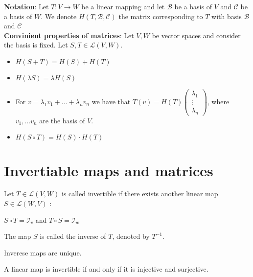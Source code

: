 \textbf{Notation}: Let $T : V \rightarrow W$ be a linear mapping and let $\mathcal{B}$ be a basis of $V$ and $\mathcal{C}$ be a basis of $W$. We denote $H(T, \mathcal{B}, \mathcal{C})$ the matrix corresponding to $T$ with basis $\mathcal{B}$ and $\mathcal{C}$ \\

\textbf{Convinient properties of matrices}: Let $V, W$ be vector spaces and consider the basis is fixed. Let $S, T \in \mathcal{L}(V, W)$. 

\begin{itemize}
	\item $H(S+T) = H(S) + H(T)$
	\item $H(\lambda S) = \lambda H(S)$
	\item For $v = \lambda_1 v_1 + ... + \lambda_n v_n$ we have that $T(v) =   H(T) \begin{pmatrix}
	\lambda_1 \\
	\vdots \\
	\lambda_n
	\end{pmatrix}$, where $v_1,...v_n$ are the basis of $V$.
	\item $H(S \circ T) = H(S) \cdot  H(T)$
\end{itemize}

\section{Invertiable maps and matrices}

\begin{definition}
	Let $T \in \mathcal{L}(V,W)$ is called invertible if there exists another linear map $S \in \mathcal{L}(W,V)$ :
	\begin{center}
			$S \circ T = \mathcal{I}_v$ and $T \circ S = \mathcal{I}_w$
	\end{center}
\end{definition}
The map $S$ is called the inverse of $T$, denoted by $T^{-1}$. 

\begin{proposition}
	Inverese maps are unique.
\end{proposition}

\begin{proposition}
	A linear map is invertible if and only if it is injective and surjective.
\end{proposition}

